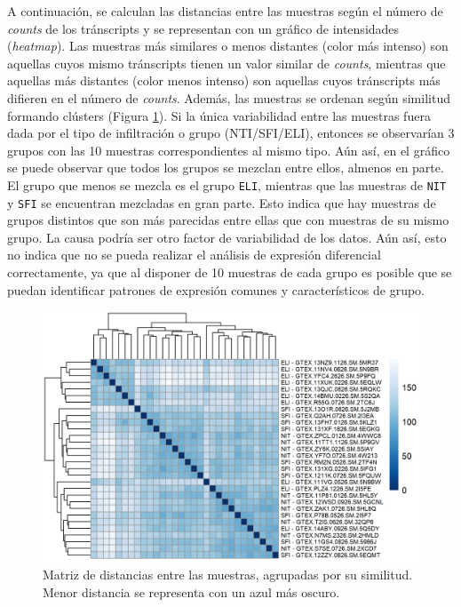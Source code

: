 \documentclass[
]{article}
\begin{document}
A continuación, se calculan las distancias entre las muestras según el
número de \emph{counts} de los tránscripts y se representan con un
gráfico de intensidades (\emph{heatmap}). Las muestras más similares o
menos distantes (color más intenso) son aquellas cuyos mismo tránscripts
tienen un valor similar de \emph{counts}, mientras que aquellas más
distantes (color menos intenso) son aquellas cuyos tránscripts más
difieren en el número de \emph{counts}. Además, las muestras se ordenan
según similitud formando clústers (Figura \ref{fig:Fig4}). Si la única
variabilidad entre las muestras fuera dada por el tipo de infiltración o
grupo (NTI/SFI/ELI), entonces se observarían 3 grupos con las 10
muestras correspondientes al mismo tipo. Aún así, en el gráfico se puede
observar que todos los grupos se mezclan entre ellos, almenos en parte.
El grupo que menos se mezcla es el grupo \texttt{ELI}, mientras que las
muestras de \texttt{NIT} y \texttt{SFI} se encuentran mezcladas en gran
parte. Esto indica que hay muestras de grupos distintos que son más
parecidas entre ellas que con muestras de su mismo grupo. La causa
podría ser otro factor de variabilidad de los datos. Aún así, esto no
indica que no se pueda realizar el análisis de expresión diferencial
correctamente, ya que al disponer de 10 muestras de cada grupo es
posible que se puedan identificar patrones de expresión comunes y
característicos de grupo.

\begin{figure}

{\centering \includegraphics[width=0.8\linewidth]{results/2.AnaDescript/2.DistMuestras_2} 

}

\caption{Matriz de distancias entre las muestras, agrupadas por su similitud. Menor distancia se representa con un azul más oscuro.}\label{fig:Fig4}
\end{figure}
\end{document}

